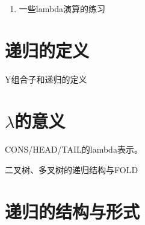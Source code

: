 \documentclass[UTF8]{article}
\begin{document}
\begin{Exercise}
\begin{enumerate}
\item 一些lambda演算的练习
\end{enumerate}
\end{Exercise}

\section{递归的定义}

Y组合子和递归的定义




\section{$\lambda$的意义}

CONS/HEAD/TAIL的lambda表示。

二叉树、多叉树的递归结构与FOLD

\section{递归的结构与形式}

\end{document}
